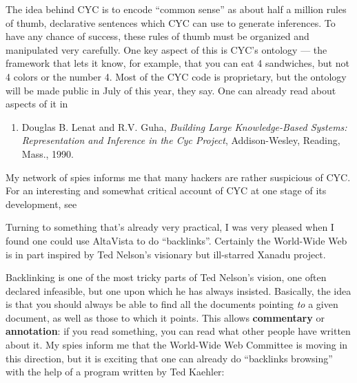 \documentclass{article}
\def\tightlist{}
\renewcommand{\texttt}[1]{%
  \begingroup
  \ttfamily
  \begingroup\lccode`~=`/\lowercase{\endgroup\def~}{/\discretionary{}{}{}}%
  \begingroup\lccode`~=`[\lowercase{\endgroup\def~}{[\discretionary{}{}{}}%
  \begingroup\lccode`~=`.\lowercase{\endgroup\def~}{.\discretionary{}{}{}}%
  \catcode`/=\active\catcode`[=\active\catcode`.=\active
  \scantokens{#1\noexpand}%
  \endgroup
}
\begin{document}
The idea behind CYC is to encode ``common sense'' as about half a
million rules of thumb, declarative sentences which CYC can use to
generate inferences. To have any chance of success, these rules of thumb
must be organized and manipulated very carefully. One key aspect of this
is CYC's ontology --- the framework that lets it know, for example, that
you can eat 4 sandwiches, but not 4 colors or the number 4. Most of the
CYC code is proprietary, but the ontology will be made public in July of
this year, they say. One can already read about aspects of it in

\begin{enumerate}
\def\labelenumi{\arabic{enumi})}
\setcounter{enumi}{2}
\tightlist
\item
  Douglas B. Lenat and R.V. Guha, \emph{Building Large Knowledge-Based
  Systems: Representation and Inference in the Cyc Project},
  Addison-Wesley, Reading, Mass., 1990.
\end{enumerate}

My network of spies informs me that many hackers are rather suspicious
of CYC. For an interesting and somewhat critical account of CYC at one
stage of its development, see


Turning to something that's already very practical, I was very pleased
when I found one could use AltaVista to do ``backlinks''. Certainly the
World-Wide Web is in part inspired by Ted Nelson's visionary but
ill-starred Xanadu project.


Backlinking is one of the most tricky parts of Ted Nelson's vision, one
often declared infeasible, but one upon which he has always insisted.
Basically, the idea is that you should always be able to find all the
documents pointing \emph{to} a given document, as well as those to which
it points. This allows \textbf{commentary} or \textbf{annotation}: if
you read something, you can read what other people have written about
it. My spies inform me that the World-Wide Web Committee is moving in
this direction, but it is exciting that one can already do ``backlinks
browsing'' with the help of a program written by Ted Kaehler:
\end{document}

